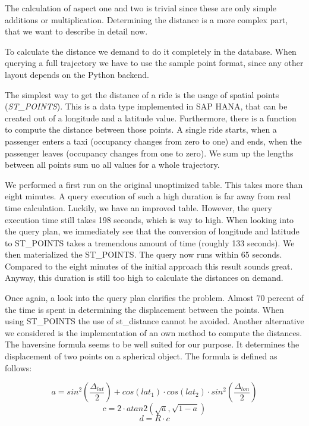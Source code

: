 \documentclass[10pt]{sig-alternate}
\begin{document}
The calculation of aspect one and two is trivial since these are only simple additions or multiplication. Determining the distance is a more complex part, that we want to describe in detail now.

To calculate the distance we demand to do it completely in the database. When querying a full trajectory we have to use the sample point format, since any other layout depends on the Python backend.

The simplest way to get the distance of a ride is the usage of spatial points (\textit{ST\_POINTS}). This is a data type implemented in SAP HANA, that can be created out of a longitude and a latitude value. Furthermore, there is a function to compute the distance between those points. A single ride starts, when a passenger enters a taxi (occupancy changes from zero to one) and ends, when the passenger leaves (occupancy changes from one to zero). We sum up the lengths between all points sum uo all values for a whole trajectory.

We performed a first run on the original unoptimized table. This takes more than eight minutes. A query execution of such a high duration is far away from real time calculation. Luckily, we have an improved table. However, the query execution time still takes 198 seconds, which is way to high. When looking into the query plan, we immediately see that the conversion of longitude and latitude to ST\_POINTS takes a tremendous amount of time (roughly 133 seconds). We then materialized the ST\_POINTS. The query now runs within 65 seconds. Compared to the eight minutes of the initial approach this result sounds great. Anyway, this duration is still too high to calculate the distances on demand.

Once again, a look into the query plan clarifies the problem. Almost 70 percent of the time is spent in determining the displacement between the points. When using ST\_POINTS the use of st\_distance cannot be avoided. Another alternative we considered is the implementation of an own method to compute the distances. The haversine formula seems to be well suited for our purpose. It determines the displacement of two points on a spherical object. The formula is defined as follows:

\begin{equation} a = sin^2(\frac{\Delta_{lat}}{2}) + cos(lat_1) \cdot cos(lat_2) \cdot sin^2(\frac{\Delta_{lon}}{2}) \end{equation}
\begin{equation} c = 2 \cdot atan2(\sqrt{a}, \sqrt{1 - a}) \end{equation}
\begin{equation} d = R \cdot c \end{equation}
\end{document}
